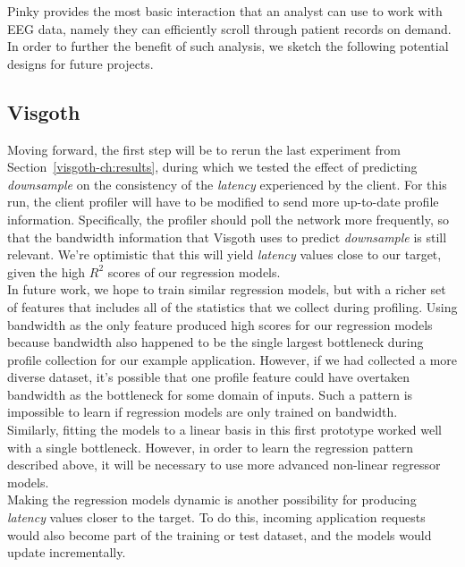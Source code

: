 Pinky provides the most basic interaction that an analyst can use to work with
EEG data, namely they can efficiently scroll through patient records on demand.
In order to further the benefit of such analysis, we sketch the following
potential designs for future projects.


\subsection{Visgoth}\label{discuss-ch:visgoth-future-work}

Moving forward, the first step will be to rerun the last experiment from
Section~\ref{visgoth-ch:results}, during which we tested the effect of predicting
\emph{downsample} on the consistency of the \emph{latency} experienced by the
client. For this run, the client profiler will have to be modified to send more
up-to-date profile information. Specifically, the profiler should poll the
network more frequently, so that the bandwidth information that Visgoth uses to
predict \emph{downsample} is still relevant. We're optimistic that this will
yield \emph{latency} values close to our target, given the high $R^2$ scores of
our regression models.\\

In future work, we hope to train similar regression models, but with a richer
set of features that includes all of the statistics that we collect during
profiling. Using bandwidth as the only feature produced high scores for our
regression models because bandwidth also happened to be the single largest
bottleneck during profile collection for our example application. However, if
we had collected a more diverse dataset, it's possible that one profile feature
could have overtaken bandwidth as the bottleneck for some domain of inputs.
Such a pattern is impossible to learn if regression models are only trained on
bandwidth.\\

Similarly, fitting the models to a linear basis in this first prototype worked
well with a single bottleneck. However, in order to learn the regression
pattern described above, it will be necessary to use more advanced non-linear
regressor models.\\

Making the regression models dynamic is another possibility for producing
\emph{latency} values closer to the target. To do this, incoming application
requests would also become part of the training or test dataset, and the models
would update incrementally.\\


